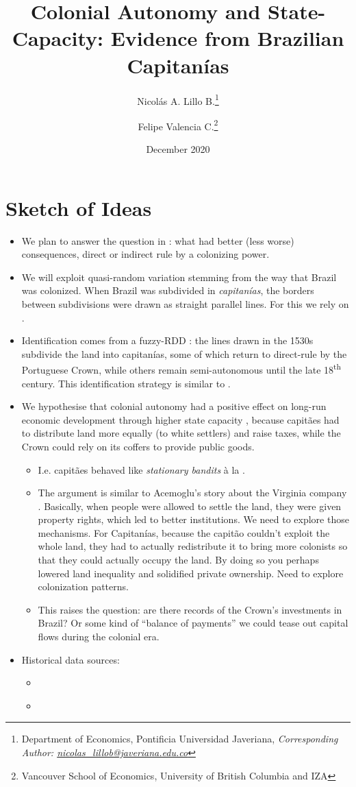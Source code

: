 \documentclass[11pt,a4paper]{article}
\title{Colonial Autonomy and State-Capacity: Evidence from Brazilian Capitan\'ias}
\date{December 2020}
\author{Nicol\'as A. Lillo B.\thanks{Department of Economics, Pontificia Universidad Javeriana, \emph{Corresponding Author: \href{mailto:nicolas_lillob@javeriana.edu.co}{nicolas\_lillob@javeriana.edu.co}}} \and Felipe Valencia C.\thanks{Vancouver School of Economics, University of British Columbia and IZA}}
\begin{document}
	\maketitle
	
	\section{Sketch of Ideas}
	\begin{itemize}
		\item We plan to answer the question in \textcite{Iyer2010}: what had better (less worse) consequences, direct or indirect rule by a colonizing power.
		\item We will exploit quasi-random variation stemming from the way that Brazil was colonized. When Brazil was subdivided in \emph{capitan\'ias}, the borders between subdivisions were drawn as straight parallel lines. For this we rely on \textcite{Cintra2013}.
		\item Identification comes from a fuzzy-RDD \parencite{Cattaneo2019,Cattaneo2019a}: the lines drawn in the 1530s subdivide the land into capitan\'ias, some of which return to direct-rule by the Portuguese Crown, while others remain semi-autonomous until the late 18\textsuperscript{th} century. This identification strategy is similar to \textcite{Michalopoulos2014}.
		\item We hypothesise that colonial autonomy had a positive effect on long-run economic development through higher state capacity \parencite{Besley2009}, because capit\~aes had to distribute land more equally (to white settlers) and raise taxes, while the Crown could rely on its coffers to provide public goods. 
		\begin{itemize}
			\item I.e. capit\~aes behaved like \emph{stationary bandits} \`{a} la \textcite{Olson1993}.
			\item The argument is similar to Acemoglu's story about the Virginia company \parencite{AcemogluRobinson2012_whynationsfail}. Basically, when people were allowed to settle the land, they were given property rights, which led to better institutions. We need to explore those mechanisms. For Capitan\'ias, because the capit\~ao couldn't exploit the whole land, they had to actually redistribute it to bring more colonists so that they could actually occupy the land. By doing so  you perhaps lowered land inequality and solidified private ownership. Need to explore colonization patterns.
			\item This raises the question: are there records of the Crown's investments in Brazil? Or some kind of ``balance of payments'' we could tease out capital flows during the colonial era.
		\end{itemize}
		\item Historical data sources:
		\begin{itemize}
			\item \textcite{Naritomi2007,Naritomi2012}
			\item \textcite{Fujiwara2017}
		\end{itemize}
	\end{itemize}
\end{document}

